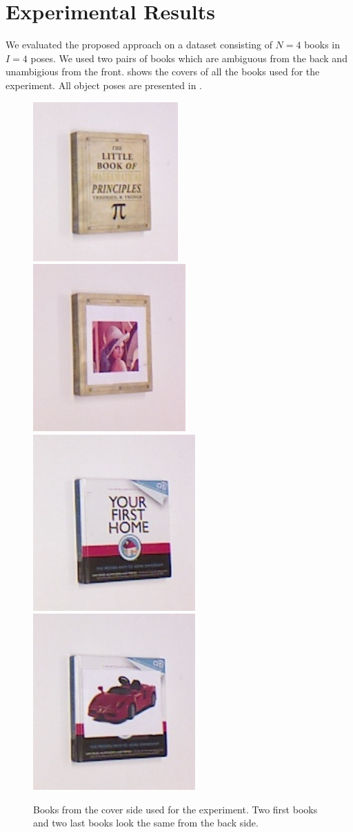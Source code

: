 \section{Experimental Results}



    We evaluated the proposed approach on a dataset consisting of $N = 4$ books in $I = 4$ poses. We used two pairs of books which are ambiguous from the back and unambigious from the front.  shows the covers of all the books used for the experiment. All object poses are presented in . 
    
\begin{figure}
\centering
    		\includegraphics[width = 0.2\columnwidth]{pics/math_cover1_ok.jpg}
    		\includegraphics[width = 0.2\columnwidth]{pics/math_cover2_ok.jpg}
    		\includegraphics[width = 0.2\columnwidth]{pics/first_cover1.jpg}
    		\includegraphics[width = 0.2\columnwidth]{pics/first_cover2.jpg}
    		\caption{Books from the cover side used for the experiment. Two first books and two last books look the same from the back side.}
	\label{fig:object_dataset}
    \end{figure}     
    
